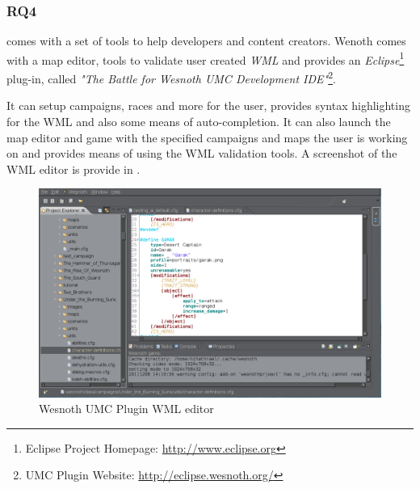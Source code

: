 \subsubsection{RQ4}
\BOW{} comes with a set of tools to help developers and content creators. Wenoth comes with a  map editor, tools to
validate user created \textit{WML} and provides an \textit{Eclipse}\footnote{Eclipse Project Homepage:
\url{http://www.eclipse.org}} plug-in, called \textit{"The Battle for Wesnoth UMC Development IDE"}\footnote{UMC Plugin
Website: \url{http://eclipse.wesnoth.org/}}.

It can setup
campaigns, races and more for the user, provides syntax highlighting for the WML and also some means of auto-completion. 
It can also launch the map editor and game with the specified campaigns and maps the user is working on and provides
means of using the WML validation tools. A screenshot of the WML editor is provide in .

\begin{figure}[h!]
    \centering
    \includegraphics[width=\textwidth]{pics/wesnothumc}
    \caption{Wesnoth UMC Plugin WML editor}
    \label{fig:wesnothumc}
\end{figure}


